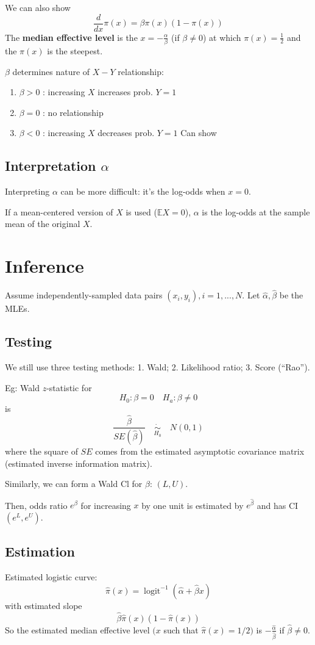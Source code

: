 \documentclass[11pt]{elegantbook}
\begin{document}
We can also show $$\frac{d}{d x} \pi(x)=\beta \pi(x)(1-\pi(x))$$
The \textbf{median effective level} is the $x=-\frac{\alpha}{\beta}$ (if $\beta\neq 0$) at which $\pi(x) = \frac{1}{2}$ and the $\pi(x)$ is the steepest.

$\beta$ determines nature of $X-Y$ relationship:
\begin{enumerate}[-]
    \item $\beta>0$ : increasing $X$ increases prob. $Y=1$
    \item $\beta=0$ : no relationship
    \item $\beta<0$ : increasing $X$ decreases prob. $Y=1$
    Can show
\end{enumerate}

\subsection{Interpretation $\alpha$}
Interpreting $\alpha$ can be more difficult: it's the log-odds when $x = 0$.

If a mean-centered version of $X$ is used ($\mathbb{E}X=0$), $\alpha$ is the log-odds at the sample mean of the original $X$.

\section{Inference}
Assume independently-sampled data pairs $(x_i,y_i), i=1,...,N$. Let $\hat{\alpha},\hat{\beta}$ be the MLEs.

\subsection{Testing}
We still use three testing methods: 1. Wald; 2. Likelihood ratio; 3. Score (“Rao”).

Eg: Wald $z$-statistic for
$$
H_0: \beta=0 \quad H_a: \beta \neq 0
$$
is
$$
\frac{\hat{\beta}}{S E(\hat{\beta})}\quad \underset{H_0}{\dot{\sim}}\quad N(0,1)
$$
where the square of $S E$ comes from the estimated asymptotic covariance matrix (estimated inverse information matrix).

Similarly, we can form a Wald $\mathrm{Cl}$ for $\beta$: $(L,U)$.

Then, odds ratio $e^\beta$ for increasing $x$ by one unit is estimated by $e^{\hat{\beta}}$ and has CI $(e^L,e^U)$.

\subsection{Estimation}
Estimated logistic curve:
$$
\hat{\pi}(x)=\operatorname{logit}^{-1}(\hat{\alpha}+\hat{\beta} x)
$$
with estimated slope
$$
\hat{\beta} \hat{\pi}(x)(1-\hat{\pi}(x))
$$
So the estimated median effective level $(x$ such that $\hat{\pi}(x)=1 / 2)$ is $-\frac{\hat{\alpha}}{\hat{\beta}}$ if $\hat{\beta} \neq 0$.
\end{document}
